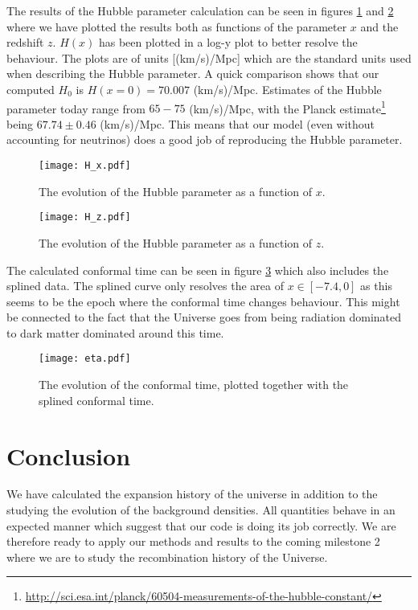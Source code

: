 \documentclass[a4paper, 10pt, reqno]{amsart}
\begin{document}
The results of the Hubble parameter calculation can be seen in figures
\ref{fig: H_x} and \ref{fig: H_z} where we have plotted the results
both as functions of the parameter $x$ and the redshift $z$. $H(x)$ has been plotted in a log-y plot to better resolve the behaviour. The plots are of units [(km/s)/Mpc] which are the standard units used when describing the Hubble parameter. A quick comparison shows that our computed $H_0$ is $H(x=0) = 70.007$ (km/s)/Mpc. Estimates of the Hubble parameter today range from $65-75$ (km/s)/Mpc, with the Planck estimate\footnote{\url{http://sci.esa.int/planck/60504-measurements-of-the-hubble-constant/}} being $67.74 \pm 0.46$ (km/s)/Mpc. This means that our model (even without accounting for neutrinos) does a good job of reproducing the Hubble parameter.

\begin{figure}
    \centering
    \texttt{[image: H\_x.pdf]}
    \caption{The evolution of the Hubble parameter as a function of
    $x$.}
    \label{fig: H_x}
\end{figure}

\begin{figure}
    \centering
    \texttt{[image: H\_z.pdf]}
    \caption{The evolution of the Hubble parameter as a function of
    $z$.}
    \label{fig: H_z}
\end{figure}

The calculated conformal time can be seen in figure \ref{fig: eta}
which also includes the splined data. The splined curve only resolves
the area of $x \in [-7.4, 0]$ as this seems to be the epoch where the conformal
time changes behaviour. This might be connected to the fact that the
Universe goes from being radiation dominated to dark matter dominated around this time.

\begin{figure}
    \centering
    \texttt{[image: eta.pdf]}
    \caption{The evolution of the conformal time, plotted together with
    the splined conformal time.}
    \label{fig: eta}
\end{figure}

\section{Conclusion}
We have calculated the expansion history of the universe in addition to
the studying the evolution of the background densities. All quantities
behave in an expected manner which suggest that our code is doing its
job correctly. We are therefore ready to apply our methods and results
to the coming milestone 2 where we are to study the recombination
history of the Universe.

\nocite{*}
{}

\end{document}
